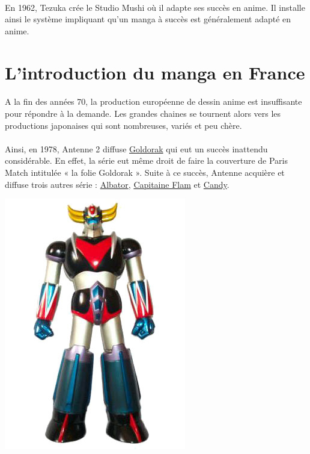 \paragraph{} En 1962, Tezuka crée le Studio Mushi où il adapte ses succès en
anime. Il installe ainsi le système impliquant qu’un manga à succès est
généralement adapté en anime.

\section{L'introduction du manga en France}

\paragraph{} A la fin des années 70, la production européenne de dessin anime
est insuffisante pour répondre à la demande. Les grandes chaines se tournent
alors vers les productions japonaises qui sont nombreuses, variés et peu chère. 

\paragraph{} Ainsi, en 1978, Antenne 2 diffuse \underline{Goldorak} qui eut un
succès inattendu considérable. En effet, la série eut même droit de faire la
couverture de Paris Match intitulée « la folie Goldorak ».  Suite à ce succès,
Antenne acquière et diffuse trois autres série : \underline{Albator},
\underline{Capitaine Flam} et \underline{Candy}.

\begin{center}
	\includegraphics[scale=0.4]{goldorak.jpg}
\end{center}

